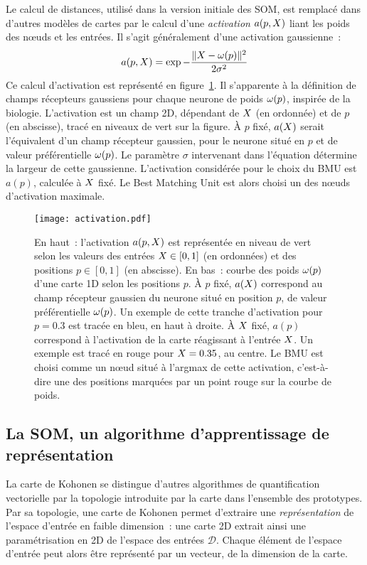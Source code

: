 \documentclass[../main]{subfiles}
\begin{document}
Le calcul de distances, utilisé dans la version initiale des SOM, est remplacé dans d'autres modèles de cartes par le calcul d'une \emph{activation} $a(p, X)$ liant les poids des n\oe{}uds et les entrées. Il s'agit généralement d'une activation gaussienne~:
\begin{equation}\label{eq:activation}
    a(p, X) = \exp{-\frac{\lVert X- \omega(p)\rVert^2}{2\sigma^2}}
\end{equation}
Ce calcul d'activation est représenté en figure~\ref{fig:activation}. Il s'apparente à la définition de champs récepteurs gaussiens pour chaque neurone de poids $\omega(p)$, inspirée de la biologie.
L'activation est un champ 2D, dépendant de $X$ (en ordonnée) et de $p$ (en abscisse), tracé en niveaux de vert sur la figure.
\`A $p$ fixé, $a(X)$ serait l'équivalent d'un champ récepteur gaussien, pour le neurone situé en $p$ et de valeur préférentielle $\omega(p)$. 
Le paramètre $\sigma$ intervenant dans l'équation détermine la largeur de cette gaussienne.
L'activation considérée pour le choix du BMU est $a(p)$, calculée à $X$ fixé. Le Best Matching Unit est alors choisi un des n\oe{}uds d'activation maximale.

\begin{figure}
    \centering\texttt{[image: activation.pdf]}
    \caption{En haut~: l'activation $a(p, X)$ est représentée en niveau de vert selon les valeurs des entrées $X \in [0,1]$ (en ordonnées) et des positions $p \in [0,1]$ (en abscisse).
    En bas~: courbe des poids $\omega(p)$ d'une carte 1D selon les positions $p$. 
    \`A  $p$ fixé, $a(X)$ correspond au champ récepteur gaussien du neurone situé en position $p$, de valeur préférentielle $\omega(p)$. 
    Un exemple de cette tranche d'activation pour $p = 0.3$ est tracée en bleu, en haut à droite.
    \`A $X$ fixé, $a(p)$ correspond à l'activation de la carte réagissant à l'entrée $X$. Un exemple est tracé en rouge pour $X = 0.35$, au centre.
    Le BMU est choisi comme un n\oe{}ud situé à l'argmax de cette activation, c'est-à-dire une des positions marquées par un point rouge sur la courbe de poids. \label{fig:activation}
    }
\end{figure}

\subsection{La SOM, un algorithme d'apprentissage de représentation}

La carte de Kohonen se distingue d'autres algorithmes de quantification vectorielle par la topologie introduite par la carte dans l'ensemble des prototypes.
Par sa topologie, une carte de Kohonen permet d'extraire une \emph{représentation} de l'espace d'entrée en faible dimension~: une carte 2D extrait ainsi une paramétrisation en 2D de l'espace des entrées $\mathcal{D}$.
Chaque élément de l'espace d'entrée peut alors être représenté par un vecteur, de la dimension de la carte.
\end{document}

